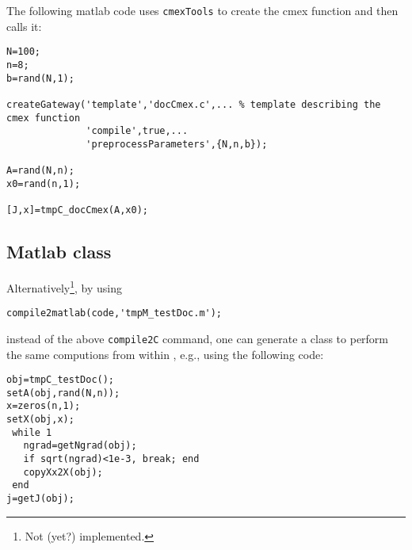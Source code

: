 \documentclass[11pt]{article}
\newcommand{\CMEX}{\texttt{cmexTools}}
\begin{document}
The following matlab code uses \CMEX{} to create the cmex function and
then calls it:
\begin{lstlisting}
N=100;
n=8;
b=rand(N,1);

createGateway('template','docCmex.c',... % template describing the cmex function
              'compile',true,...
              'preprocessParameters',{N,n,b});

A=rand(N,n);
x0=rand(n,1);

[J,x]=tmpC_docCmex(A,x0);
\end{lstlisting}




\subsection{Matlab class}

Alternatively\footnote{Not (yet?) implemented.}, by using
\begin{lstlisting}
compile2matlab(code,'tmpM_testDoc.m');
\end{lstlisting}
instead of the above \lstinline{compile2C} command, one can generate a
\matlab{} class to perform the same computions from within \matlab{},
e.g., using the following code:
\begin{lstlisting}
obj=tmpC_testDoc();
setA(obj,rand(N,n));
x=zeros(n,1);
setX(obj,x);
 while 1
   ngrad=getNgrad(obj);
   if sqrt(ngrad)<1e-3, break; end
   copyXx2X(obj);
 end
j=getJ(obj);
\end{lstlisting}




% 
% 
% 

\end{document}
